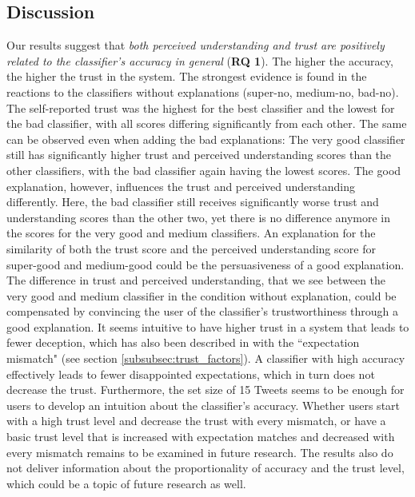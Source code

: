 \subsection{Discussion}
Our results suggest that \textit{both perceived understanding and trust are positively related to the classifier's accuracy in general} (\textbf{RQ 1}). The higher the accuracy, the higher the trust in the system. The strongest evidence is found in the reactions to the classifiers without explanations (super-no, medium-no, bad-no). The self-reported trust was the highest for the best classifier and the lowest for the bad classifier, with all scores differing significantly from each other. The same can be observed even when adding the bad explanations: The very good classifier still has significantly higher trust and perceived understanding scores than the other classifiers, with the bad classifier again having the lowest scores. The good explanation, however, influences the trust and perceived understanding differently. Here, the bad classifier still receives significantly worse trust and understanding scores than the other two, yet there is no difference anymore in the scores for the very good and medium classifiers. \newline
An explanation for the similarity of both the trust score and the perceived understanding score for super-good and medium-good could be the persuasiveness of a good explanation. The difference in trust and perceived understanding, that we see between the very good and medium classifier in the condition without explanation, could be compensated by convincing the user of the classifier's trustworthiness through a good explanation.\newline
It seems intuitive to have higher trust in a system that leads to fewer deception, which has also been described in \cite{glass2008toward} with the ``expectation mismatch" (see section \ref{subsubsec:trust_factors}). A classifier with high accuracy effectively leads to fewer disappointed expectations, which in turn does not decrease the trust. Furthermore, the set size of 15 Tweets seems to be enough for users to develop an intuition about the classifier's accuracy. Whether users start with a high trust level and decrease the trust with every mismatch, or have a basic trust level that is increased with expectation matches and decreased with every mismatch remains to be examined in future research. The results also do not deliver information about the proportionality of accuracy and the trust level, which could be a topic of future research as well. \medskip \newline

